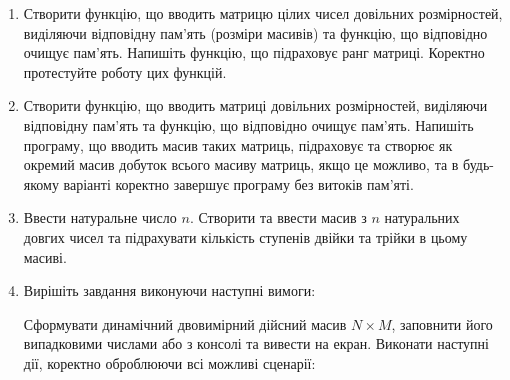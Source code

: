 \documentclass[a5paper,titlepage,openany,twoside,draft]{book_unv}%
\begin{document}
\begin{enumerate}
\def\labelenumi{\arabic{enumi})}
\setcounter{enumi}{4}
\item
  Створити функцію, що вводить матрицю цілих чисел довільних
  розмірностей, виділяючи відповідну пам'ять (розміри масивів) та
  функцію, що відповідно очищує пам'ять. Напишіть функцію, що підраховує
  ранг матриці. Коректно протестуйте роботу цих функцій.
\item
  Створити функцію, що вводить матриці довільних розмірностей, виділяючи
  відповідну пам'ять та функцію, що відповідно очищує пам'ять. Напишіть
  програму, що вводить масив таких матриць, підраховує та створює як
  окремий масив добуток всього масиву матриць, якщо це можливо, та в
  будь-якому варіанті коректно завершує програму без витоків пам'яті.

\item
  Ввести натуральне число $n$. Створити та ввести масив з $n$ натуральних
 довгих чисел та підрахувати кількість ступенів двійки та трійки в цьому масиві.
\item
  Вирішіть завдання виконуючи наступні вимоги:

Сформувати динамічний двовимірний дійсний масив $N \times M$, заповнити його випадковими
числами або з консолі та вивести на екран. Виконати наступні дії, коректно оброблюючи 
всі можливі сценарії:


\end{enumerate}
\end{document}
